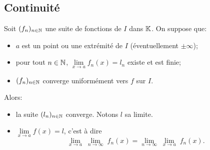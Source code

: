 \documentclass{book}
\newcommand{\fn}{(f_n)_{n\in \N   }}
\begin{document}
\subsection{Continuité}\label{sec:cont}
\begin{Theoreme}
Soit $\fn$ une suite de fonctions de $I$ dans $\mathbb{K}  $.
On suppose que:
\begin{itemize}
\item
  $a$ est un point ou une extrémité de $I$ (éventuellement $±\infty$);
\item
  pour tout $n\in \mathbb{N}   $, $\lim\limits_{x\to a} f_n(x) = l_n$ existe et est finie;
\item
  $\fn$ converge uniformément vers $f$ sur $I$.
\end{itemize}
Alors:
\begin{itemize}
\item
  la suite $(l_n)_{n\in \mathbb{N}   }$ converge. Notons $l$ sa limite.
\item
  $\lim\limits_{x\to a} f(x) = l$, c'est à dire
  \[ 
      \lim_{x\to a} \; \lim_{n\to\infty} \; f_n(x) = \lim_{n\to\infty} \; \lim_{x\to a} \; f_n(x).
   \]
\end{itemize}
\end{Theoreme}
%  
\end{document}
